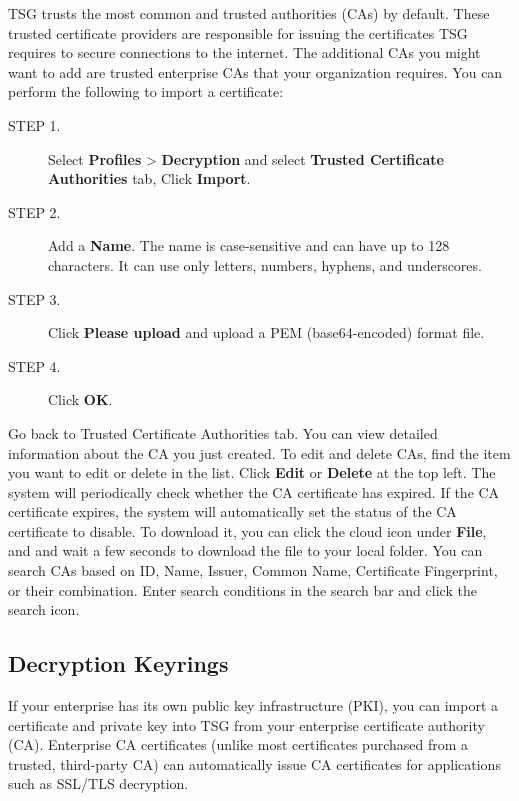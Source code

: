 TSG trusts the most common and trusted authorities (CAs) by default. These trusted certificate providers are responsible for issuing the certificates 
TSG requires to secure connections to the internet. The additional CAs you might want to add are trusted enterprise CAs that your organization requires. 
You can perform the following to import a certificate:

\begin{description}
    \item[STEP 1.]	Select \textbf{Profiles} > \textbf{Decryption} and select \textbf{Trusted Certificate Authorities} tab, Click \textbf{Import}.
    \item[STEP 2.]	Add a \textbf{Name}. The name is case-sensitive and can have up to 128 characters. It can use only letters, numbers, hyphens, and underscores.
    \item[STEP 3.]	Click \textbf{Please upload} and upload a PEM (base64-encoded) format file.
    \item[STEP 4.]	Click \textbf{OK}.    
\end{description}

Go back to Trusted Certificate Authorities tab. You can view detailed information about the CA you just created. 
To edit and delete CAs, find the item you want to edit or delete in the list. Click \textbf{Edit} or \textbf{Delete} at the top left. 
The system will periodically check whether the CA certificate has expired. 
If the CA certificate expires, the system will automatically set the status of the CA certificate to disable. 
To download it, you can click the cloud icon under \textbf{File}, and and wait a few seconds to download the file to your local folder. 
You can search CAs based on ID, Name, Issuer, Common Name, Certificate Fingerprint, or their combination. Enter search conditions in the search bar and click the search icon.

\subsection*{\hypertarget{link:Decryption Keyrings}{Decryption Keyrings}}
\label{sec:decrypt:certificate:keyring}

If your enterprise has its own public key infrastructure (PKI), you can import a certificate and private key into TSG from your enterprise certificate authority (CA). 
Enterprise CA certificates (unlike most certificates purchased from a trusted, third-party CA) can automatically issue CA certificates for applications such as SSL/TLS decryption.


